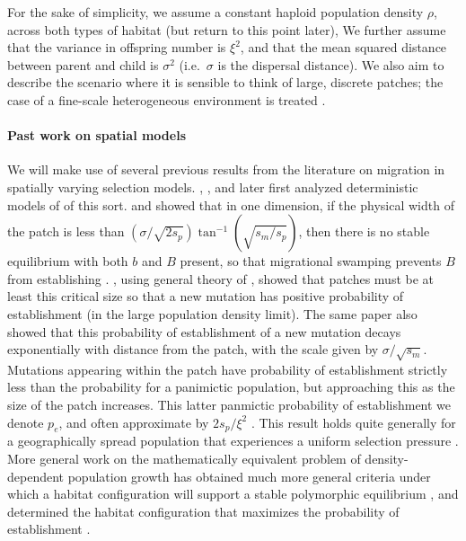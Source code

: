 \documentclass{article}
\begin{document}
For the sake of simplicity, we assume a constant haploid population density $\rho$, 
across both types of habitat (but return to this point later),
We further assume that the variance in offspring number is $\xi^2$, 
and that the mean squared distance between parent and child is $\sigma^2$
(i.e.\ $\sigma$ is the dispersal distance).
We also aim to describe the scenario where it is sensible to think of large, discrete patches;
the case of a fine-scale heterogeneous environment is treated \citep{elsewhere}.

\paragraph{Past work on spatial models}
We will make use of several previous results from the literature on
migration in spatially varying selection models. 
\citet{haldane1948theory}, \citet{fisher1950frequencies}, and later \citet{slatkin1973geneflow} first analyzed
deterministic models of of this sort.
\citet{nagylaki1975conditions} and \citet{conley1975application} showed that in one dimension, if the physical width of the patch is less than $(\sigma/\sqrt{2s_p}) \tan^{-1} (\sqrt{s_m/s_p})$, 
then there is no stable equilibrium with both $b$ and $B$ present,  %
so that migrational swamping prevents $B$ from establishing \citep[see also][ for a review]{lenormand2002limits}.
\citet{barton1987establishment}, using general theory of \citet{pollak1966survival}, showed  
that patches must be at least this critical size so that a new mutation has positive probability of establishment
(in the large population density limit).
The same paper also showed that
this probability of establishment of a new mutation decays exponentially with distance from the patch, 
with the scale given by $\sigma/\sqrt{s_m}$. Mutations appearing within the patch have probability of establishment
strictly less than the probability for a panimictic population,
but approaching this as the size of the patch increases.
This latter panmictic probability of establishment we denote $p_e$,
and often approximate by $2 s_p / \xi^2$ \citep{haldane1927mathematical,fisher1930genetical}.
This result holds quite generally for a geographically spread population that experiences a uniform selection
pressure \citep{maruyama1970fixation,cherry2003diffusion}. 
More general work on the mathematically equivalent problem of density-dependent population growth 
has obtained much more general criteria
under which a habitat configuration will support a stable polymorphic equilibrium \citep{cantrell1989diffusive},
and determined the habitat configuration that maximizes the probability of establishment \citep{lou2006minimization}.
\end{document}
